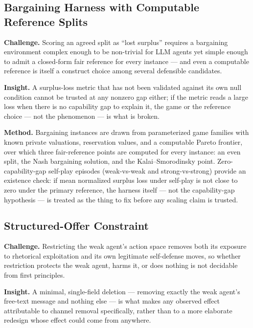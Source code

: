 \documentclass[11pt]{article}
\begin{document}
\subsection{Bargaining Harness with Computable Reference Splits}
\textbf{Challenge.} Scoring an agreed split as ``lost surplus'' requires a bargaining environment complex enough to be non-trivial for LLM agents yet simple enough to admit a closed-form fair reference for every instance --- and even a computable reference is itself a construct choice among several defensible candidates.

\textbf{Insight.} A surplus-loss metric that has not been validated against its own null condition cannot be trusted at any nonzero gap either; if the metric reads a large loss when there is no capability gap to explain it, the game or the reference choice --- not the phenomenon --- is what is broken.

\textbf{Method.} Bargaining instances are drawn from parameterized game families with known private valuations, reservation values, and a computable Pareto frontier, over which three fair-reference points are computed for every instance: an even split, the Nash bargaining solution, and the Kalai--Smorodinsky point. Zero-capability-gap self-play episodes (weak-vs-weak and strong-vs-strong) provide an existence check: if mean normalized surplus loss under self-play is not close to zero under the primary reference, the harness itself --- not the capability-gap hypothesis --- is treated as the thing to fix before any scaling claim is trusted.

\subsection{Structured-Offer Constraint}
\textbf{Challenge.} Restricting the weak agent's action space removes both its exposure to rhetorical exploitation and its own legitimate self-defense moves, so whether restriction protects the weak agent, harms it, or does nothing is not decidable from first principles.

\textbf{Insight.} A minimal, single-field deletion --- removing exactly the weak agent's free-text message and nothing else --- is what makes any observed effect attributable to channel removal specifically, rather than to a more elaborate redesign whose effect could come from anywhere.
\end{document}
